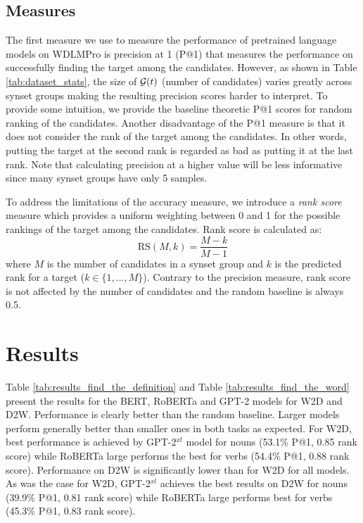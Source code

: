 \documentclass[11pt,a4paper]{article}
\begin{document}
\subsection{Measures}

  
The first measure we use to measure the performance of
pretrained language models on WDLMPro is precision at 1 (P@1) that measures the performance on successfully finding the target among the candidates. 
However, as shown in Table \ref{tab:dataset_stats}, the size of ${\cal G}(t)$ (number of candidates) varies greatly across synset groups making the resulting precision scores harder to interpret. 
To provide some intuition, we provide the baseline theoretic
P@1 scores for random ranking of the candidates. 
Another disadvantage of the P@1 measure is that it does not consider the rank of the target among the candidates. 
In other words, putting the target at the second rank is regarded as bad as putting it at the last rank. Note that calculating precision at a higher value will be less informative since many synset groups have only 5 samples. 

  
To address the limitations of the accuracy measure, we introduce a \textit{rank score} measure which provides a uniform weighting between 0 and 1 for the possible rankings of the target among the candidates. Rank score is calculated as:
\begin{equation*}
    \text{RS}(M,k) = \frac{M-k}{M-1}
\end{equation*}
where $M$ is the number of candidates in a synset group and $k$ is the predicted rank for a target ($k \in
\{1,...,M\}$). Contrary to the precision measure, rank score is not affected by the number of candidates and the random baseline is always 0.5.  

\section{Results}

Table \ref{tab:results_find_the_definition} and Table
\ref{tab:results_find_the_word} present the results for the
BERT, RoBERTa and GPT-2 models
for W2D and D2W. Performance is clearly better than the
random baseline.
Larger models perform generally better than smaller
ones in both tasks as expected. For W2D,
best performance is achieved by GPT-2$^{xl}$ model for 
nouns (53.1\% P@1, 0.85 rank score) while RoBERTa large
performs the best for  verbs (54.4\% P@1, 0.88 rank
score). Performance on D2W is
significantly lower than for W2D for all
models.  As was the case for W2D, GPT-2$^{xl}$ achieves the
best results on D2W for  nouns (39.9\% P@1, 0.81 rank
score) while RoBERTa large performs best for  verbs
(45.3\% P@1, 0.83 rank score).
\end{document}
